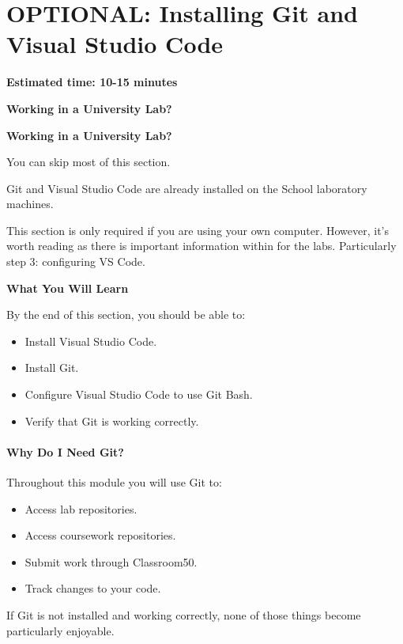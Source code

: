 \documentclass{csc2059practical}
\begin{document}
\section{OPTIONAL: Installing Git and Visual Studio Code}
\begin{infobox}
\textbf{Estimated time: 10-15 minutes}
\end{infobox}
\begin{importantnote}
\textbf{Working in a University Lab?}\par
\medskip
\textbf{Working in a University Lab?}


You can skip most of this section.


Git and Visual Studio Code are already installed on the School laboratory machines.


This section is only required if you are using your own computer. However, it's worth reading as there is important information within for the labs. Particularly step 3: configuring VS Code.


\end{importantnote}
\begin{learningoutcomes}
\textbf{What You Will Learn}\par
\medskip
By the end of this section, you should be able to:

\begin{itemize}
  \item Install Visual Studio Code.
  \item Install Git.
  \item Configure Visual Studio Code to use Git Bash.
  \item Verify that Git is working correctly.
\end{itemize}
\end{learningoutcomes}
\paragraph{Why Do I Need Git?}
Throughout this module you will use Git to:

\begin{itemize}
  \item Access lab repositories.
  \item Access coursework repositories.
  \item Submit work through Classroom50.
  \item Track changes to your code.
\end{itemize}
If Git is not installed and working correctly, none of those things become particularly enjoyable.
\end{document}

